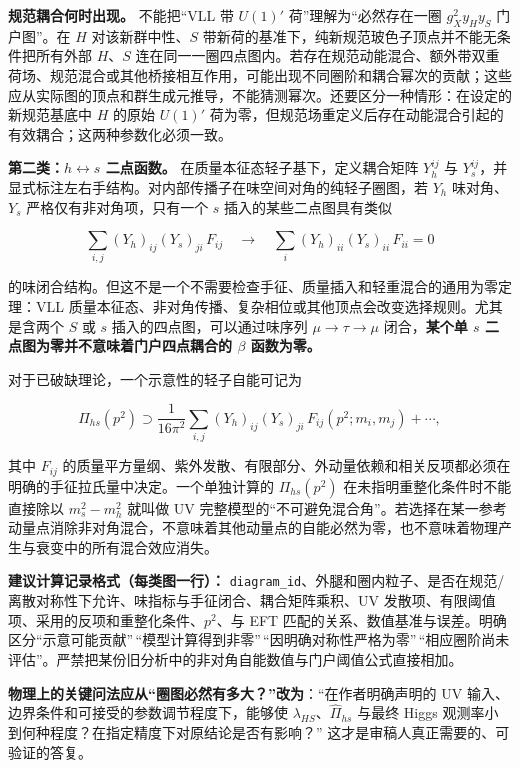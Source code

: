\documentclass[
  chinese,
  UTF8]{ctexart}
\begin{document}
\textbf{规范耦合何时出现。} 不能把``VLL 带 \(U(1)'\)
荷''理解为``必然存在一圈 \(g_X^2y_Hy_S\) 门户图''。在 \(H\)
对该新群中性、\(S\)
带新荷的基准下，纯新规范玻色子顶点并不能无条件把所有外部 \(H\)、\(S\)
连在同一一圈四点图内。若存在规范动能混合、额外带双重荷场、规范混合或其他桥接相互作用，可能出现不同圈阶和耦合幂次的贡献；这些应从实际图的顶点和群生成元推导，不能猜测幂次。还要区分一种情形：在设定的新规范基底中
\(H\) 的原始 \(U(1)'\)
荷为零，但规范场重定义后存在动能混合引起的有效耦合；这两种参数化必须一致。

\textbf{第二类：\(h\!\leftrightarrow\!s\) 二点函数。}
在质量本征态轻子基下，定义耦合矩阵 \(Y_h^{ij}\) 与
\(Y_s^{ij}\)，并显式标注左右手结构。对内部传播子在味空间对角的纯轻子圈图，若
\(Y_h\) 味对角、\(Y_s\) 严格仅有非对角项，只有一个 \(s\)
插入的某些二点图具有类似

\[
\sum_{i,j}(Y_h)_{ij}(Y_s)_{ji}\,F_{ij}
\quad\longrightarrow\quad
\sum_i (Y_h)_{ii}(Y_s)_{ii}\,F_{ii}=0
\]

的味闭合结构。但这不是一个不需要检查手征、质量插入和轻重混合的通用为零定理：VLL
质量本征态、非对角传播、复杂相位或其他顶点会改变选择规则。尤其是含两个
\(S\) 或 \(s\) 插入的四点图，可以通过味序列 \(\mu\to\tau\to\mu\)
闭合，\textbf{某个单 \(s\) 二点图为零并不意味着门户四点耦合的 \(\beta\)
函数为零。}

对于已破缺理论，一个示意性的轻子自能可记为

\[
\Pi_{hs}(p^2)\supset
\frac{1}{16\pi^2}
\sum_{i,j}(Y_h)_{ij}(Y_s)_{ji}\,
F_{ij}(p^2;m_i,m_j)+\cdots,
\]

其中 \(F_{ij}\)
的质量平方量纲、紫外发散、有限部分、外动量依赖和相关反项都必须在明确的手征拉氏量中决定。一个单独计算的
\(\Pi_{hs}(p^2)\) 在未指明重整化条件时不能直接除以 \(m_s^2-m_h^2\)
就叫做 UV
完整模型的``不可避免混合角''。若选择在某一参考动量点消除非对角混合，不意味着其他动量点的自能必然为零，也不意味着物理产生与衰变中的所有混合效应消失。

\textbf{建议计算记录格式（每类图一行）：}
\texttt{diagram\_id}、外腿和圈内粒子、是否在规范/离散对称性下允许、味指标与手征闭合、耦合矩阵乘积、UV
发散项、有限阈值项、采用的反项和重整化条件、\(p^2\)、与 EFT
匹配的关系、数值基准与误差。明确区分``示意可能贡献''\,``模型计算得到非零''\,``因明确对称性严格为零''\,``相应圈阶尚未评估''。严禁把某份旧分析中的非对角自能数值与门户阈值公式直接相加。

\textbf{物理上的关键问法应从``圈图必然有多大？''改为}：``在作者明确声明的
UV 输入、边界条件和可接受的参数调节程度下，能够使
\(\lambda_{HS}\)、\(\widehat\Pi_{hs}\) 与最终 Higgs
观测率小到何种程度？在指定精度下对原结论是否有影响？''
这才是审稿人真正需要的、可验证的答复。
\end{document}
